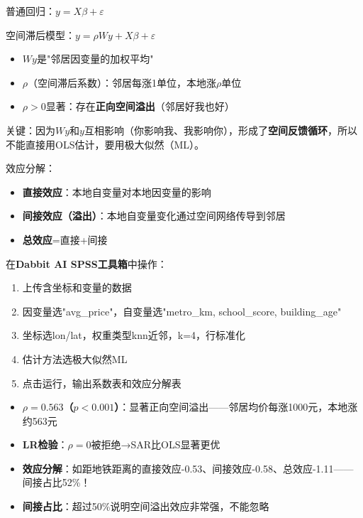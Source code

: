 \begin{algoprinciple}
普通回归：$y = X\beta + \varepsilon$

空间滞后模型：$y = \rho W y + X\beta + \varepsilon$

\begin{itemize}
    \item $Wy$是"邻居因变量的加权平均"
    \item $\rho$（空间滞后系数）：邻居每涨1单位，本地涨$\rho$单位
    \item $\rho>0$显著：存在\textbf{正向空间溢出}（邻居好我也好）
\end{itemize}

关键：因为$Wy$和$y$互相影响（你影响我、我影响你），形成了\textbf{空间反馈循环}，所以不能直接用OLS估计，要用极大似然（ML）。

效应分解：
\begin{itemize}
    \item \textbf{直接效应}：本地自变量对本地因变量的影响
    \item \textbf{间接效应（溢出）}：本地自变量变化通过空间网络传导到邻居
    \item \textbf{总效应}=直接+间接
\end{itemize}
\end{algoprinciple}

\begin{algosposs}
在\textbf{Dabbit AI SPSS工具箱}中操作：

\begin{enumerate}
    \item 上传含坐标和变量的数据
    \item 因变量选"avg\_price"，自变量选"metro\_km, school\_score, building\_age"
    \item 坐标选lon/lat，权重类型knn近邻，k=4，行标准化
    \item 估计方法选极大似然ML
    \item 点击运行，输出系数表和效应分解表
\end{enumerate}
\end{algosposs}

\begin{algoresult}
\begin{itemize}
    \item \textbf{$\rho=0.563$（$p<0.001$）}：显著正向空间溢出——邻居均价每涨1000元，本地涨约563元
    \item \textbf{LR检验}：$\rho=0$被拒绝→SAR比OLS显著更优
    \item \textbf{效应分解}：如距地铁距离的直接效应-0.53、间接效应-0.58、总效应-1.11——间接占比52\%！
    \item \textbf{间接占比}：超过50\%说明空间溢出效应非常强，不能忽略
\end{itemize}
\end{algoresult}


